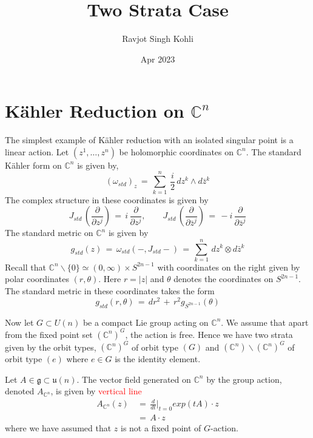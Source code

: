 \documentclass[a4paper,12pt]{article}
\title{Two Strata Case}
\author{Ravjot Singh Kohli}
\date{Apr 2023}
\newcommand{\C}{\mathbb{C}}
\newcommand{\red}[1]{\textcolor{red}{#1}}
\newcommand{\abs}[1]{\lvert #1 \rvert}
\begin{document}
	\maketitle
	
	\section{K\"ahler Reduction on $\C^n$}
	The simplest example of K\"ahler reduction with an isolated singular point is a linear action. Let $(z^1,\dots,z^n)$ be holomorphic coordinates on $\C^n$. The standard K\"ahler form on $\C^n$ is given by,
	\begin{equation}\label{standardkahler}
		(\omega_{std})_{z} \,=\,  \sum_{k=1}^n \, \frac{i}{2} \, dz^k \wedge d\bar{z}^k
	\end{equation}
	The complex structure in these coordinates is given by 
	\begin{equation}
		J_{std}\, \left(\frac{\partial}{\partial z^j} \right) \,=\, i \, \frac{\partial}{\partial z^j}, \qquad J_{std}\, \left( \frac{\partial}{\partial \bar{z}^j} \right) \,=\, -i \, \frac{\partial}{\partial \bar{z}^j}
	\end{equation}
	The standard metric on $\C^n$ is given by
	\begin{equation}
		g_{std}(z) \,=\, \omega_{std}(-,J_{std}-) \,=\, \sum_{k=1}^n \, dz^k \otimes d\bar{z}^k
	\end{equation}
	Recall that $\C^n\backslash\{0\} \simeq (0,\infty) \times S^{2n-1}$ with coordinates on the right given by polar coordinates $(r,\theta)$. Here $r = \abs{z}$ and $\theta$ denotes the coordinates on $S^{2n-1}$.
	The standard metric in these coordinates takes the form
	\begin{equation}
		g_{std}(r,\theta) \,=\, dr^2 \,+\, r^2 g_{S^{2n-1}}(\theta)
	\end{equation}
	
	Now let $G\subset U(n)$ be a compact Lie group acting on $\C^n$. We assume that apart from the fixed point set $(\C^n)^G$, the action is free. Hence we have two strata given by the orbit types, $(\C^n)^G$ of orbit type $(G)$ and $(\C^n)\backslash (\C^n)^G$ of orbit type $(e)$  where $e\in G$ is the identity element. 
	
	Let $A\in \mathfrak{g} \subset \mathfrak{u}(n)$. The vector field generated on $\C^n$ by the group action, denoted $A_{\C^n}$, is given by \red{vertical line}
	\begin{equation}
		\begin{split}
			A_{\C^n}(z) \,&=\, \frac{d}{dt}\rvert_{t=0} exp(tA)\cdot z\\
				&=\, A \cdot z
		\end{split}
	\end{equation}
	where we have assumed that $z$ is not a fixed point of $G$-action.
	
\end{document}

